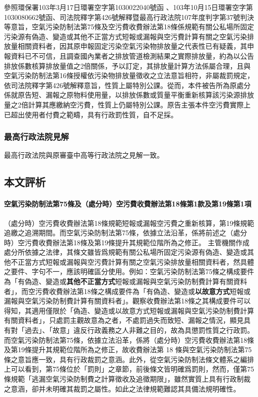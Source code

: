 \documentclass[14pt,a4paper]{article}
\begin{document}
參照環保署103年3月17日環署空字第1030022040號函
、103年10月15日環署空字第1030080662號函、司法院釋字第426號解釋暨最高行政法院107年度判字第37號判決等意旨，空氣污染防制法第75條及空污費收費辦法第18條係規範有關公私場所固定污染源有偽造、變造或其他不正當方式短報或漏報與空污費計算有關之空氣污染排放量相關資料者，因其原申報固定污染空氣污染物排放量之代表性已有疑義，其申報資料已不可信，且調查國內業者之排放管道檢測結果之實際排放量，約為以公告排放係數核算排放量值之2倍關係，予以訂定，其排放量計算方法係屬合理，且與空氣污染防制法第16條授權依污染物排放量徵收之立法意旨相符，非屬裁罰規定，依司法院釋字第426號解釋意旨，性質上屬特別公課。從而，本件被告所為原處分係就原告短、漏報之原物料使用量，以排放係數或質量平衡重新核算該污染源排放量之2倍計算其應繳納空污費，性質上仍屬特別公課。原告主張本件空污費實際上已超出使用者付費之範疇，具有行政罰性質，自不足採。



\subsubsection{最高行政法院見解}
最高行政法院與原審臺中高等行政法院之見解一致。

\subsection{本文評析}

\paragraph*{空氣污染防制法第75條及（處分時）空污費收費辦法第18條第1款及第19條第1項} 
（處分時）空污費收費辦法第18條規範短報或漏報空污費之重新核算，第19條規範追繳之追溯期間。而空氣污染防制法第75條，依據立法沿革，係將前述之（處分時）空污費收費辦法第18條及第19條提升其規範位階所為之修正。
主管機關作成處分所依據之法律，其條文雖皆爲規範有關公私場所固定污染源有偽造、變造或其他不正當方式短報或漏報與空污費計算有關之空氣污染排放量相關資料者，然具體之要件、字句不一，應該明確區分使用。例如：空氣污染防制法第75條之構成要件為「有偽造、變造或\textbf{其他不正當方式}短報或漏報與空氣污染防制費計算有關資料者」，而空污費收費辦法第18條之構成要件為「有偽造、變造或\textbf{以故意方式}短報或漏報與空氣污染防制費計算有關資料者」。觀察收費辦法第18條之其構成要件可以得知，其適用僅限於「偽造、變造或以故意方式短報或漏報與空氣污染防制費計算有關資料者」，只處罰主觀故意為之者，不處罰過失而致短、漏報之情況，顯見具有對「過去」、「故意」違反行政義務之人非難之目的，故為具懲罰性質之行政罰。而空氣污染防制法第75條，依據立法沿革，係將（處分時）空污費收費辦法第18條及第19條提升其規範位階所為之修正，故收費辦法第 18 條與空氣污染防制法第75條之意旨應一致，具有行政裁罰之意涵。此外，從空氣污染防制法條文體系之編排上可以看到，第75條位於「罰則」之章節，前後條文皆明確爲罰則，然而，僅第75條規範「逃漏空氣污染防制費之計算徵收及追徵期限」，雖然實質上具有行政制裁之意涵，卻并未明確其裁罰之屬性。如此之法律規範難認其具備法規明確性。
\end{document}
